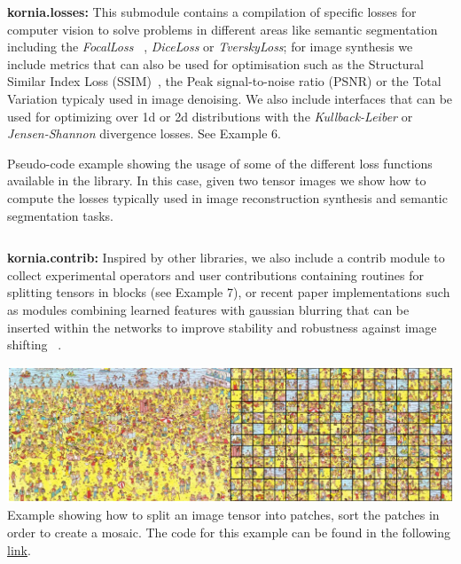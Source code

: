 \newpage

\textbf{kornia.losses:} This submodule contains a compilation of specific losses for computer vision to solve problems in different areas like semantic segmentation including the \textit{FocalLoss} ~\citep{DBLP:journals/corr/abs-1708-02002}, \textit{DiceLoss} or \textit{TverskyLoss}; for image synthesis we include metrics that can also be used for optimisation such as the Structural Similar Index Loss (SSIM)~\citep{Wang:2004:IQA:2319031.2320551}, the Peak signal-to-noise ratio (PSNR) or the Total Variation typicaly used in  image denoising. We also include interfaces that can be used for optimizing over 1d or 2d distributions with the \textit{Kullback-Leiber} or \textit{Jensen-Shannon} divergence losses. See Example 6.

\begin{tcolorbox}[every float=\centering, drop shadow, title=Example 6: Computer vision losses]
    \label{fig:examples:losses_snipet}
    Pseudo-code example showing the usage of some of the different loss functions available in the library. In this case, given two tensor images we show how to compute the losses typically used in image reconstruction synthesis and semantic segmentation  tasks.
    \inputminted[python3, baselinestretch=1., style=vs, fontfamily=courier, fontsize=\footnotesize, funcnamehighlighting=true]{python}{main/chapter03/data/examples/snipet_losses.py}
\end{tcolorbox}

\textbf{kornia.contrib:} Inspired by other libraries, we also include a  contrib module  to collect experimental operators and user contributions containing routines for splitting tensors in blocks (see Example 7), or recent paper implementations such as modules combining learned features with gaussian blurring that can be inserted within the networks to improve stability and robustness against image shifting ~\citep{zhang2019shiftinvar}.

\begin{tcolorbox}[every float=\centering, drop shadow, title=Example 7: Extract image patches]
    \label{fig:examples:contrib}
    \includegraphics[width=1.\linewidth]{main/chapter03/data/examples/wally_patches.jpg}
    {Example showing how to split an image tensor into patches, sort the patches in order to create a mosaic. The code for this example can be found in the following \underline{\color{blue}\href{https://colab.research.google.com/drive/1JEPVShMILiFd4VfbJ5P3qTrqajSfR0Xv}{link}}.}
    \inputminted[python3, baselinestretch=1., style=vs, fontfamily=courier, fontsize=\footnotesize, funcnamehighlighting=true]{python}{main/chapter03/data/examples/snipet_contrib.py}
\end{tcolorbox}

